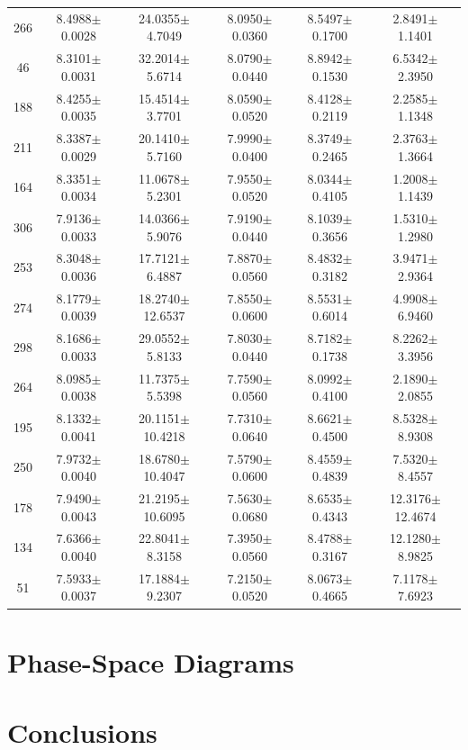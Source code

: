 \documentclass{aa}
\begin{document}
\begin{table}
\begin{center}
{{\begin{tabular}{|cccccc|}
266 & 8.4988$\pm$0.0028 & 24.0355$\pm$4.7049 & 8.0950$\pm$0.0360 & 8.5497$\pm$0.1700 & 2.8491$\pm$1.1401 \\
46 & 8.3101$\pm$0.0031 & 32.2014$\pm$5.6714 & 8.0790$\pm$0.0440 & 8.8942$\pm$0.1530 & 6.5342$\pm$2.3950 \\
188 & 8.4255$\pm$0.0035 & 15.4514$\pm$3.7701 & 8.0590$\pm$0.0520 & 8.4128$\pm$0.2119 & 2.2585$\pm$1.1348 \\
211 & 8.3387$\pm$0.0029 & 20.1410$\pm$5.7160 & 7.9990$\pm$0.0400 & 8.3749$\pm$0.2465 & 2.3763$\pm$1.3664 \\
164 & 8.3351$\pm$0.0034 & 11.0678$\pm$5.2301 & 7.9550$\pm$0.0520 & 8.0344$\pm$0.4105 & 1.2008$\pm$1.1439 \\
306 & 7.9136$\pm$0.0033 & 14.0366$\pm$5.9076 & 7.9190$\pm$0.0440 & 8.1039$\pm$0.3656 & 1.5310$\pm$1.2980 \\
253 & 8.3048$\pm$0.0036 & 17.7121$\pm$6.4887 & 7.8870$\pm$0.0560 & 8.4832$\pm$0.3182 & 3.9471$\pm$2.9364 \\
274 & 8.1779$\pm$0.0039 & 18.2740$\pm$12.6537 & 7.8550$\pm$0.0600 & 8.5531$\pm$0.6014 & 4.9908$\pm$6.9460 \\
298 & 8.1686$\pm$0.0033 & 29.0552$\pm$5.8133 & 7.8030$\pm$0.0440 & 8.7182$\pm$0.1738 & 8.2262$\pm$3.3956 \\
264 & 8.0985$\pm$0.0038 & 11.7375$\pm$5.5398 & 7.7590$\pm$0.0560 & 8.0992$\pm$0.4100 & 2.1890$\pm$2.0855 \\
195 & 8.1332$\pm$0.0041 & 20.1151$\pm$10.4218 & 7.7310$\pm$0.0640 & 8.6621$\pm$0.4500 & 8.5328$\pm$8.9308 \\
250 & 7.9732$\pm$0.0040 & 18.6780$\pm$10.4047 & 7.5790$\pm$0.0600 & 8.4559$\pm$0.4839 & 7.5320$\pm$8.4557 \\
178 & 7.9490$\pm$0.0043 & 21.2195$\pm$10.6095 & 7.5630$\pm$0.0680 & 8.6535$\pm$0.4343 & 12.3176$\pm$12.4674 \\
134 & 7.6366$\pm$0.0040 & 22.8041$\pm$8.3158 & 7.3950$\pm$0.0560 & 8.4788$\pm$0.3167 & 12.1280$\pm$8.9825 \\
51 & 7.5933$\pm$0.0037 & 17.1884$\pm$9.2307 & 7.2150$\pm$0.0520 & 8.0673$\pm$0.4665 & 7.1178$\pm$7.6923 \\ \hline
\end{tabular}
}}
\end{center}
\end{table}

\section{Phase-Space Diagrams}






\section{Conclusions}

  
\begin{acknowledgements}

\end{acknowledgements}


%
%
\end{document}
